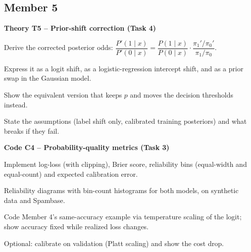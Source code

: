 \documentclass[11pt,a4paper]{article}
\begin{document}
\subsection*{Member 5}
\textbf{Theory T5 -- Prior-shift correction (Task 4)}
\begin{todo}
  \item Derive the corrected posterior odds:
        $\dfrac{P'(1\mid x)}{P'(0\mid x)} = \dfrac{P(1\mid x)}{P(0\mid x)}\cdot\dfrac{\pi_1'/\pi_0'}{\pi_1/\pi_0}$.
  \item Express it as a logit shift, as a logistic-regression intercept shift, and as a prior swap in the Gaussian model.
  \item Show the equivalent version that keeps $p$ and moves the decision thresholds instead.
  \item State the assumptions (label shift only, calibrated training posteriors) and what breaks if they fail.
\end{todo}
\textbf{Code C4 -- Probability-quality metrics (Task 3)}
\begin{todo}
  \item Implement log-loss (with clipping), Brier score, reliability bins (equal-width and equal-count) and expected calibration error.
  \item Reliability diagrams with bin-count histograms for both models, on synthetic data and Spambase.
  \item Code Member 4's same-accuracy example via temperature scaling of the logit; show accuracy fixed while realized loss changes.
  \item Optional: calibrate on validation (Platt scaling) and show the cost drop.
\end{todo}
\end{document}
